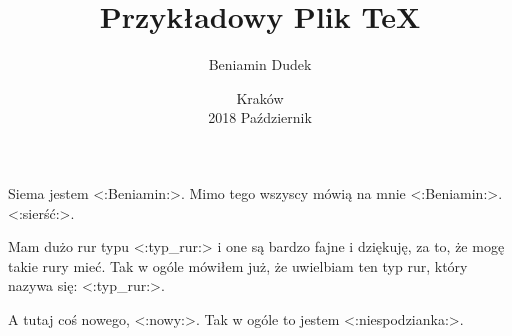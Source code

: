 \documentclass[a4paper,11pt,fleqn]{mwart}
\title{Przykładowy Plik TeX}
\date{Kraków\\ 2018 Październik}
\author{Beniamin Dudek}
\begin{document}
	\maketitle
	Siema jestem <:Beniamin:>. Mimo tego wszyscy mówią na mnie <:Beniamin:>.
	<:sierść:>.

	Mam dużo rur typu <:typ_rur:> i one są bardzo fajne i dziękuję, za to, że mogę takie rury mieć.
	Tak w ogóle mówiłem już, że uwielbiam ten typ rur, który nazywa się: <:typ_rur:>.

	A tutaj coś nowego, <:nowy:>. Tak w ogóle to jestem <:niespodzianka:>.
\end{document}
